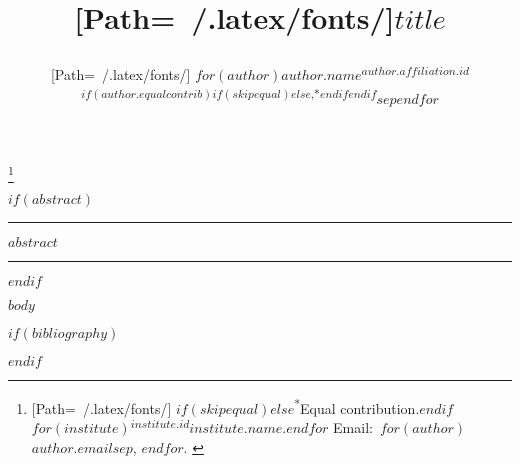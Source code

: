 \documentclass[letterpaper,twocolumn]{article}
\title{%
  \vspace{-3ex}%
  \begin{minipage}{\textwidth}%
    \begin{flushleft}%
      {\fontspec{futura_medium.ttf}[Path=\string~/.latex/fonts/]\fontsize{20}{0}\selectfont $title$}%
    \end{flushleft}%
  \end{minipage}%
  \vspace{-1ex}%
}
\author{%
  \begin{minipage}{\textwidth}%
    \begin{flushleft}%
      \hspace{-0.5em}%
      {%
        \fontspec{futura_book.ttf}[Path=\string~/.latex/fonts/]\fontsize{12}{0}\selectfont%
        $for(author)$$author.name$\textsuperscript{$author.affiliation.id$$if(author.equalcontrib)$$if(skipequal)$$else$,*$endif$$endif$}$sep$\quad $endfor$%
      }%
    \end{flushleft}%
  \end{minipage}%
}
\date{\vspace{-3ex}}
\newcommand\blfootnote[1]{%
  \begingroup
  \renewcommand\thefootnote{}\footnote{\raggedright \hspace{-20pt} #1}%
  \addtocounter{footnote}{-1}%
  \endgroup
}
\begin{document}
\maketitle
\thispagestyle{fancy}

\blfootnote{%
  {%
    \scriptsize{}[Path=\string~/.latex/fonts/]%
    $if(skipequal)$$else$\textsuperscript{*}Equal contribution.$endif$%
    $for(institute)$\mbox{\textsuperscript{$institute.id$}$institute.name$.}\enspace$endfor$%
    Email:~$for(author)$\mbox{\texttt{$author.email$}}$sep$, $endfor$.%
  }%
}

$if(abstract)$
\hrule height 1pt
\vspace{0.5em}

{\small\bfseries $abstract$}

\vspace{0.5em}
\hrule height 1pt
$endif$

$body$

$if(bibliography)$
\footnotesize
\setlength{\bibsep}{0pt plus 0.3ex}


$endif$
\end{document}
